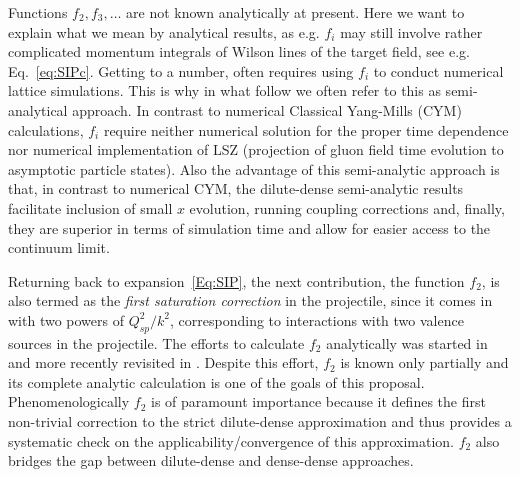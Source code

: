Functions $f_2 , f_3 , \ldots$ are
not known analytically at present.
Here we want to explain what we mean by  analytical results, 
as e.g. $f_i$ may still involve rather  complicated momentum integrals 
of  Wilson lines of the target field, see e.g. Eq.~\eqref{eq:SIPc}. 
Getting to a number, often requires using $f_i$ to 
conduct numerical lattice simulations. This is why in what follow we 
often refer to this as semi-analytical approach. 
In contrast to numerical Classical Yang-Mills (CYM)
calculations, $f_i$ require neither numerical solution 
for the proper time dependence nor numerical implementation of 
LSZ (projection of gluon field time evolution to asymptotic particle states). 
Also the advantage of this semi-analytic  
approach is that, in contrast to numerical CYM, the dilute-dense semi-analytic 
results facilitate inclusion of small $x$ evolution, 
running coupling corrections and, finally, they are superior 
in terms of simulation time and allow for easier access to 
the continuum limit. 
 

Returning back to  expansion~\eqref{Eq:SIP},  
the next contribution, 
the function $f_2$, is  also termed as the {\it first saturation correction} in the
projectile, since it comes in with two powers of $Q_{sp}^2/k^2$,
corresponding to interactions with two valence sources in the projectile. 
The efforts to calculate $f_2$ analytically was started in
\myref\cite{Balitsky:2004rr} and more recently revisited in
\myref\cite{Chirilli:2015tea}. Despite this effort,  $f_2$ is known only partially 
and its complete analytic calculation is one of the goals of this proposal. 
Phenomenologically $f_2$ is of paramount importance because it defines the first non-trivial 
correction to the strict dilute-dense approximation and thus provides a systematic
check on the applicability/convergence  of this approximation. 
$f_2$  also bridges the gap between dilute-dense and dense-dense 
approaches. 


 
